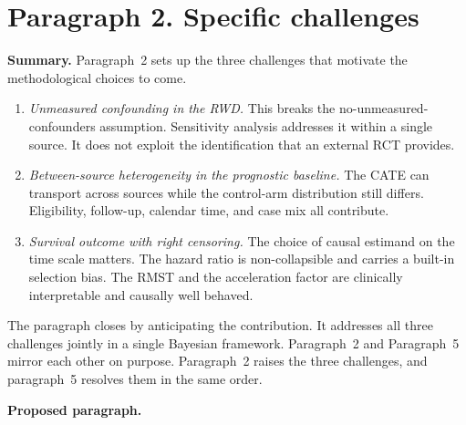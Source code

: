 \newpage
\section*{Paragraph 2. Specific challenges}

\textbf{Summary.} Paragraph~2 sets up the three challenges that motivate the methodological choices to come.
\begin{enumerate}
    \item \emph{Unmeasured confounding in the RWD.}
          This breaks the no-unmeasured-confounders assumption.
          Sensitivity analysis addresses it within a single source.
          It does not exploit the identification that an external RCT provides.
    \item \emph{Between-source heterogeneity in the prognostic baseline.}
          The CATE can transport across sources while the control-arm distribution still differs.
          Eligibility, follow-up, calendar time, and case mix all contribute.
    \item \emph{Survival outcome with right censoring.}
          The choice of causal estimand on the time scale matters.
          The hazard ratio is non-collapsible and carries a built-in selection bias.
          The RMST and the acceleration factor are clinically interpretable and causally well behaved.
\end{enumerate}
The paragraph closes by anticipating the contribution.
It addresses all three challenges jointly in a single Bayesian framework.
Paragraph~2 and Paragraph~5 mirror each other on purpose.
Paragraph~2 raises the three challenges, and paragraph~5 resolves them in the same order.

\textbf{Proposed paragraph.}

